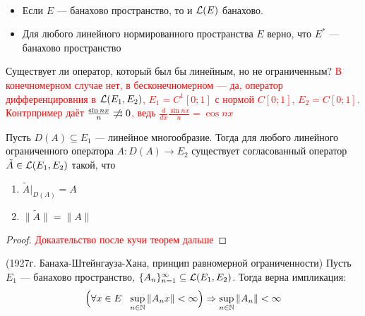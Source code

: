 \begin{corollary}~
	\begin{itemize}
		\item Если $E$ --- банахово пространство, то и $\mathcal{L}(E)$ банахово.
		
		\item Для любого линейного нормированного пространства $E$ верно, что $E^*$ --- банахово пространство
	\end{itemize}
\end{corollary}

\begin{example}
	Существует ли оператор, который был бы линейным, но не ограниченным?
	\textcolor{red}{В конечномерном случае нет, в бесконечномерном --- да, оператор дифференцировния в $\mathcal{L}(E_1, E_2)$, $E_1 = C^1[0; 1]$ с нормой $C[0; 1]$, $E_2 = C[0; 1]$. Контрпример даёт $\frac{\sin nx}{n} \centernot\rra 0$, ведь $\frac{d}{dx} \frac{\sin nx}{n} = \cos nx$}
\end{example}

\begin{theorem} \label{long_theorem}
	Пусть $D(A) \subseteq E_1$ --- линейное многообразие. Тогда для любого линейного ограниченного оператора $A \colon D(A) \to E_2$ существует согласованный оператор $\tilde{A} \in \mathcal{L}(E_1, E_2)$ такой, что
	\begin{enumerate}
		\item $\tilde{A}|_{D(A)} = A$
		
		\item $\|\tilde{A}\| = \|A\|$
	\end{enumerate}
\end{theorem}

\begin{proof}
	\textcolor{red}{Докаательство после кучи теорем дальше}
\end{proof}

\begin{theorem} (1927г. Банаха-Штейнгауза-Хана, принцип равномерной ограниченности)
	Пусть $E_1$ --- банахово пространство, $\{A_n\}_{n = 1}^\infty \subseteq \mathcal{L}(E_1, E_2)$. Тогда верна импликация:
	\[
		\Big(\forall x \in E\ \ \sup_{n \in \mathbb{N}} \|A_n x\| < \infty\Big) \Rightarrow \sup_{n \in \mathbb{N}} \|A_n\| < \infty
	\]
\end{theorem}

